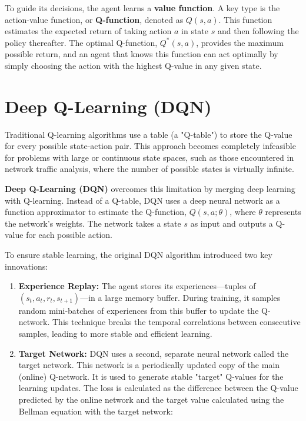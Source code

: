\documentclass[16pt]{report}
\begin{document}
To guide its decisions, the agent learns a \textbf{value function}. A key type is the action-value function, or \textbf{Q-function}, denoted as $Q(s, a)$. This function estimates the expected return of taking action $a$ in state $s$ and then following the policy thereafter. The optimal Q-function, $Q^*(s, a)$, provides the maximum possible return, and an agent that knows this function can act optimally by simply choosing the action with the highest Q-value in any given state.

\section{Deep Q-Learning (DQN)}
Traditional Q-learning algorithms use a table (a "Q-table") to store the Q-value for every possible state-action pair. This approach becomes completely infeasible for problems with large or continuous state spaces, such as those encountered in network traffic analysis, where the number of possible states is virtually infinite.

\textbf{Deep Q-Learning (DQN)} overcomes this limitation by merging deep learning with Q-learning. Instead of a Q-table, DQN uses a deep neural network as a function approximator to estimate the Q-function, $Q(s, a; \theta)$, where $\theta$ represents the network's weights. The network takes a state $s$ as input and outputs a Q-value for each possible action.

To ensure stable learning, the original DQN algorithm introduced two key innovations:
\begin{enumerate}
    \item \textbf{Experience Replay:} The agent stores its experiences—tuples of $(s_t, a_t, r_t, s_{t+1})$—in a large memory buffer. During training, it samples random mini-batches of experiences from this buffer to update the Q-network. This technique breaks the temporal correlations between consecutive samples, leading to more stable and efficient learning.
    \item \textbf{Target Network:} DQN uses a second, separate neural network called the target network. This network is a periodically updated copy of the main (online) Q-network. It is used to generate stable "target" Q-values for the learning updates. The loss is calculated as the difference between the Q-value predicted by the online network and the target value calculated using the Bellman equation with the target network:
\end{enumerate}
\end{document}
